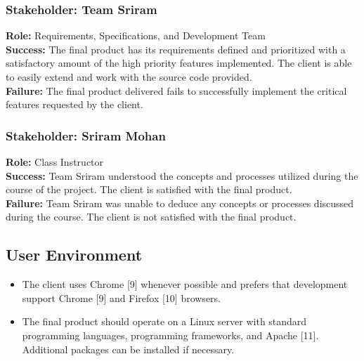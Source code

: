 \documentclass{article}
\begin{document}
\subsubsection{Stakeholder: Team Sriram}
\textbf{Role:} Requirements, Specifications, and Development Team\\
\textbf{Success:} The final product has its requirements defined and prioritized with a satisfactory amount of the high priority features implemented.  The client is able to easily extend and work with the source code provided.\\
\textbf{Failure:} The final product delivered fails to successfully implement the critical features requested by the client.

\subsubsection{Stakeholder: Sriram Mohan}
\textbf{Role:} Class Instructor\\
\textbf{Success:} Team Sriram understood the concepts and processes utilized during the course of the project. The client is satisfied with the final product.\\
\textbf{Failure:} Team Sriram was unable to deduce any concepts or processes discussed during the course. The client is not satisfied with the final product.

\subsection{User Environment}
\begin{itemize}
\item The client uses Chrome [9] whenever possible and prefers that development support Chrome [9] and Firefox [10] browsers.
\item The final product should operate on a Linux server with standard programming languages, programming frameworks, and Apache [11].  Additional packages can be installed if necessary.
\end{itemize}
\end{document}
